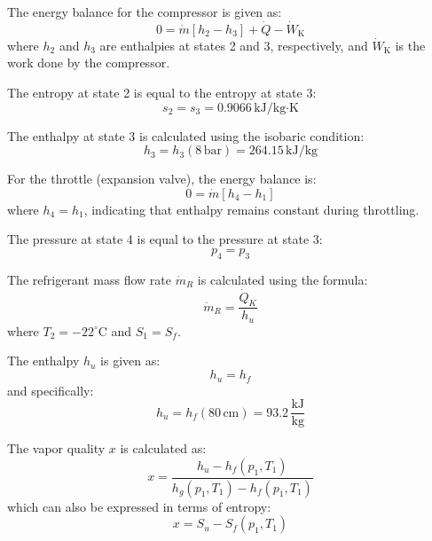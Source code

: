 The energy balance for the compressor is given as:  
\[
0 = \dot{m} \left[ h_2 - h_3 \right] + \dot{Q} - \dot{W}_{\text{K}}
\]  
where \(h_2\) and \(h_3\) are enthalpies at states 2 and 3, respectively, and \(\dot{W}_{\text{K}}\) is the work done by the compressor.  

The entropy at state 2 is equal to the entropy at state 3:  
\[
s_2 = s_3 = 0.9066 \, \text{kJ/kg·K}
\]  

The enthalpy at state 3 is calculated using the isobaric condition:  
\[
h_3 = h_3(8 \, \text{bar}) = 264.15 \, \text{kJ/kg}
\]  

For the throttle (expansion valve), the energy balance is:  
\[
0 = \dot{m} \left[ h_4 - h_1 \right]
\]  
where \(h_4 = h_1\), indicating that enthalpy remains constant during throttling.  

The pressure at state 4 is equal to the pressure at state 3:  
\[
p_4 = p_3
\]

The refrigerant mass flow rate \( \dot{m}_R \) is calculated using the formula:  
\[
\dot{m}_R = \frac{\dot{Q}_K}{h_u}
\]  
where \( T_2 = -22^\circ\text{C} \) and \( S_1 = S_f \).  

The enthalpy \( h_u \) is given as:  
\[
h_u = h_f
\]  
and specifically:  
\[
h_u = h_f(80 \, \text{cm}) = 93.2 \, \frac{\text{kJ}}{\text{kg}}
\]  

The vapor quality \( x \) is calculated as:  
\[
x = \frac{h_u - h_f(p_1, T_1)}{h_g(p_1, T_1) - h_f(p_1, T_1)}
\]  
which can also be expressed in terms of entropy:  
\[
x = S_u - S_f(p_1, T_1)
\]
